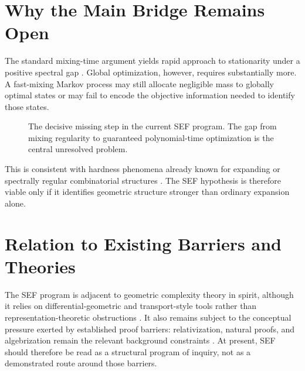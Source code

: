 \documentclass{svjour3}
\begin{document}
\section{Why the Main Bridge Remains Open}
The standard mixing-time argument yields rapid approach to stationarity under a positive spectral gap \citep{levin2009markov}. Global optimization, however, requires substantially more. A fast-mixing Markov process may still allocate negligible mass to globally optimal states or may fail to encode the objective information needed to identify those states.

\begin{figure}[t]
\centering
{}
\caption{The decisive missing step in the current SEF program. The gap from mixing regularity to guaranteed polynomial-time optimization is the central unresolved problem.}
\label{fig:sef-gap}
\end{figure}

This is consistent with hardness phenomena already known for expanding or spectrally regular combinatorial structures \citep{arora1998proof}. The SEF hypothesis is therefore viable only if it identifies geometric structure stronger than ordinary expansion alone.

\section{Relation to Existing Barriers and Theories}
The SEF program is adjacent to geometric complexity theory in spirit, although it relies on differential-geometric and transport-style tools rather than representation-theoretic obstructions \citep{mulmuley2001gct}. It also remains subject to the conceptual pressure exerted by established proof barriers: relativization, natural proofs, and algebrization remain the relevant background constraints \citep{baker1975relativizations,razborov1997natural,aaronson2009algebrization}. At present, SEF should therefore be read as a structural program of inquiry, not as a demonstrated route around those barriers.
\end{document}

